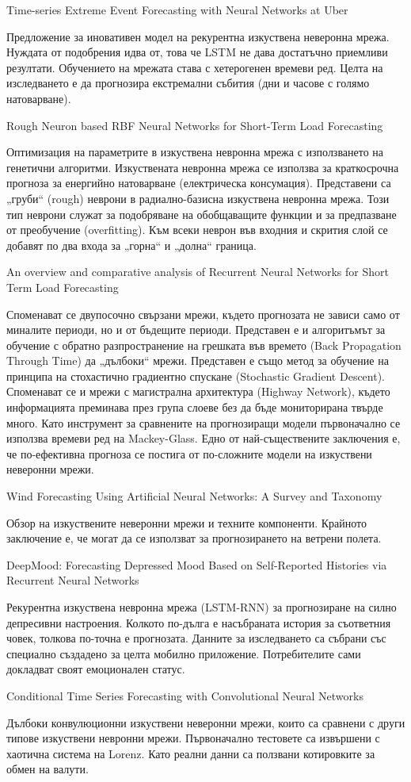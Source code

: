 ﻿Time-series Extreme Event Forecasting with Neural Networks at Uber

Предложение за иновативен модел на рекурентна изкуствена неверонна мрежа. Нуждата от подобрения идва от, това че LSTM не дава достатъчно приемливи резултати. Обучението на мрежата става с хетерогенен времеви ред. Целта на изследването е да прогнозира екстремални събития (дни и часове с голямо натоварване). 

Rough Neuron based RBF Neural Networks for Short-Term Load Forecasting

Оптимизация на параметрите в изкуствена невронна мрежа с използването на генетични алгоритми. Изкуствената невронна мрежа се използва за краткосрочна прогноза за енергийно натоварване (електрическа консумация). Представени са „груби“ (rough) неврони в радиално-базисна изкуствена невронна мрежа. Този тип неврони служат за подобряване на обобщаващите функции и за предпазване от преобучение (overfitting). Към всеки неврон във входния и скрития слой се добавят по два входа за „горна“ и „долна“ граница. 

An overview and comparative analysis of Recurrent Neural Networks for Short Term Load Forecasting

Споменават се двупосочно свързани мрежи, където прогнозата не зависи само от миналите периоди, но и от бъдещите периоди. Представен е и алгоритъмът за обучение с обратно разпространение на грешката във времето (Back Propagation Through Time) да „дълбоки“ мрежи. Представен е също метод за обучение на принципа на стохастично градиентно спускане (Stochastic Gradient Descent). Споменават се и мрежи с магистрална архитектура (Highway Network), където информацията преминава през група слоеве без да бъде мониторирана твърде много. Като инструмент за сравнените на прогнозиращи модели първоначално се използва времеви ред на Mackey-Glass. Едно от най-съществените заключения е, че по-ефективна прогноза се постига от по-сложните модели на изкуствени неверонни мрежи. 

Wind Forecasting Using Artificial Neural Networks: A
Survey and Taxonomy

Обзор на изкуствените неверонни мрежи и техните компоненти. Крайното заключение е, че могат да се използват за прогнозирането на ветрени полета. 

DeepMood: Forecasting Depressed Mood Based on Self-Reported Histories via Recurrent Neural Networks

Рекурентна изкуствена невронна мрежа (LSTM-RNN) за прогнозиране на силно депресивни настроения. Колкото по-дълга е насъбраната история за съответния човек, толкова по-точна е прогнозата. Данните за изследването са събрани със специално създадено за целта мобилно приложение. Потребителите сами докладват своят емоционален статус. 

Conditional Time Series Forecasting with Convolutional Neural
Networks

Дълбоки конвулюционни изкуствени неверонни мрежи, които са сравнени с други типове изкуствени невронни мрежи. Първоначално тестовете са извършени с хаотична система на Lorenz. Като реални данни са ползвани котировките за обмен на валути. 




